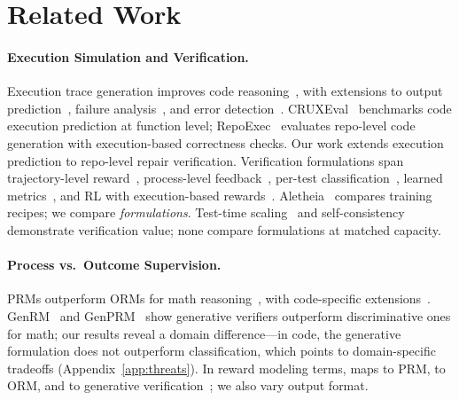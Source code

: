 \section*{Related Work}
\label{sec:related_work}

\paragraph{Execution Simulation and Verification.}
Execution trace generation improves code reasoning~\cite{nye2021scratchpad}, with extensions to output prediction~\cite{meta2025cwm,maimon2026selfexecution,liu2024codemind,liu2023codeexecutor,lee2026solidcoder}, failure analysis~\cite{abdollahi2025demystifying}, and error detection~\cite{li2024redo}. CRUXEval~\citep{gu2024cruxeval} benchmarks code execution prediction at function level; RepoExec~\citep{nam2025repoexec} evaluates repo-level code generation with execution-based correctness checks. Our work extends execution prediction to repo-level repair verification. Verification formulations span trajectory-level reward~\cite{shum2025swerm}, process-level feedback~\cite{li2025codeprm,xu2025patchreasoner}, per-test classification~\cite{ni2023lever,chen2023codet}, learned metrics~\cite{zhuo2024icescore,dong2024codescore,zhou2023codebertscore}, and RL with execution-based rewards~\cite{wang2026verpo,tang2026execverify}. Aletheia~\cite{venkatkrishna2026aletheia} compares training recipes; we compare \emph{formulations}. Test-time scaling~\cite{snell2024scaling,li2025sstar,chen2025vgsearch} and self-consistency~\cite{wang2023selfconsistency} demonstrate verification value; none compare formulations at matched capacity.

\paragraph{Process vs.\ Outcome Supervision.}
PRMs outperform ORMs for math reasoning~\cite{lightman2023letsverify,uesato2022solving}, with code-specific extensions~\cite{ye2025prlcoder,zhang2026funprm,jiang2025coderlplus,li2025codeprm}. GenRM~\cite{hosseini2025genrm} and GenPRM~\cite{zhao2026genprm} show generative verifiers outperform discriminative ones for math; our results reveal a domain difference---in code, the generative formulation does not outperform classification, which points to domain-specific tradeoffs (Appendix~\ref{app:threats}). In reward modeling terms, \cls{} maps to PRM, \traj{} to ORM, and \cwm{} to generative verification~\cite{hosseini2025genrm}; we also vary output format.

